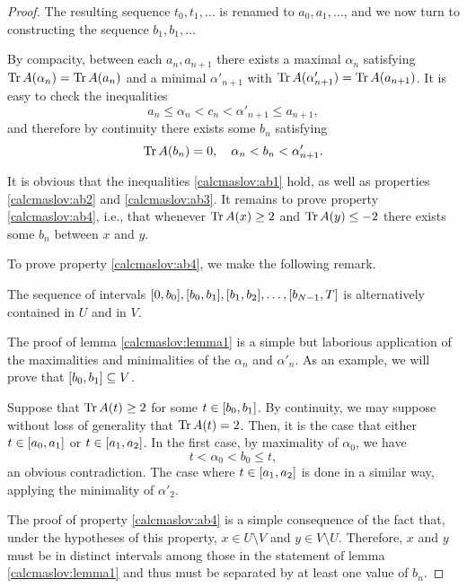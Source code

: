 \begin{proof}
The resulting sequence $t_0, t_1, \dots$ is renamed to $a_0, a_1, \dots$, and we now turn to constructing the sequence $b_1, b_1, \dots$

By compacity, between each $a_n, a_{n+1}$ there exists a maximal $\alpha_n$ satisfying $\operatorname{Tr} A(\alpha_n) = \operatorname{Tr} A(a_n)$ and a minimal $\alpha'_{n+1}$ with $\operatorname{Tr} A(\alpha'_{n+1}) = \operatorname{Tr} A(a_{n+1})$. It is easy to check the inequalities
\begin{equation}
a_n \leq \alpha_n < c_n <\alpha'_{n+1} \leq a_{n+1},
\end{equation}
and therefore by continuity there exists some $b_n$ satisfying
\begin{equation}
\operatorname{Tr} A(b_n) = 0, \quad \alpha_n < b_n < \alpha'_{n+1}.
\end{equation}

It is obvious that the inequalities \eqref{calcmaslov:ab1} hold, as well as properties \ref{calcmaslov:ab2} and \ref{calcmaslov:ab3}. It remains to prove property \ref{calcmaslov:ab4}, i.e., that whenever $\operatorname{Tr} A(x) \geq 2$ and $\operatorname{Tr} A(y) \leq -2$ there exists some $b_n$ between $x$ and $y$.

To prove property \ref{calcmaslov:ab4}, we make the following remark.
\begin{lemma}\label{calcmaslov:lemma1}
The sequence of intervals $\interval 0 {b_0}, \interval {b_0}{b_1}, \interval{b_1}{b_2}, \dots, \interval{b_{N-1}}T$ is alternatively contained in $U$ and in $V$.
\end{lemma}

\begin{lemmaproof}
The proof of lemma \ref{calcmaslov:lemma1} is a simple but laborious application of the maximalities and minimalities of the $\alpha_n$ and $\alpha'_n$. As an example, we will prove that $\interval{b_0}{b_1} \subseteq V$.

Suppose that $\operatorname{Tr} A(t) \geq 2$ for some $t \in \interval{b_0}{b_1}$. By continuity, we may suppose without loss of generality that $\operatorname{Tr} A(t) = 2$. Then, it is the case that either $t \in \interval{a_0}{a_1}$ or $t \in \interval{a_1}{a_2}$. In the first case, by maximality of $\alpha_0$, we have
\begin{equation}
t < \alpha_0 < b_0 \leq t,
\end{equation}
an obvious contradiction. The case where $t \in \interval{a_1}{a_2}$ is done in a similar way, applying the minimality of $\alpha'_2$.
\end{lemmaproof}

The proof of property \ref{calcmaslov:ab4} is a simple consequence of the fact that, under the hypotheses of this property, $x \in U \setminus V$ and $y \in V \setminus U$. Therefore, $x$ and $y$ must be in distinct intervals among those in the statement of lemma \ref{calcmaslov:lemma1} and thus must be separated by at least one value of $b_n$.


\end{proof}
